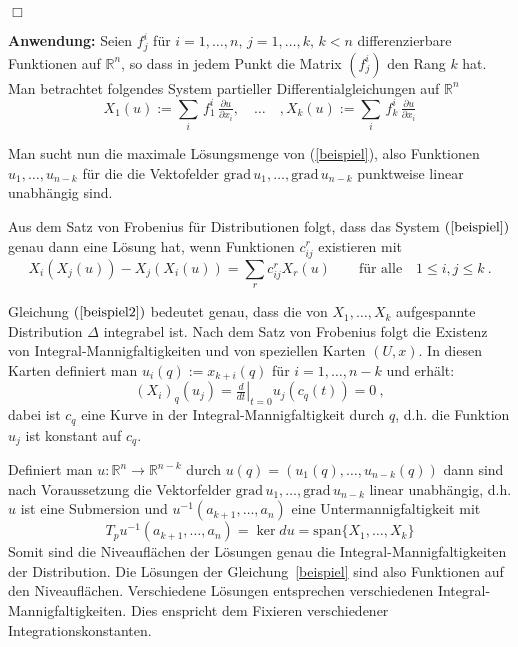 \documentclass[12pt,a4paper]{article}
\def\R{\mathbb{R}}
\def\grad{\mathrm{grad}\,}
\def\qed{\quad\hfill\ensuremath{\Box}}
\begin{document}
\qed

\bigskip

{\bf Anwendung:}
Seien $f^i_j$ f\"ur $i=1,\ldots, n, \, j=1,\ldots,k, \, k<n$ differenzierbare Funktionen auf $\R^n$, so
dass in jedem Punkt die Matrix $(f^i_j)$ den Rang $k$ hat. Man betrachtet folgendes System partieller
Differentialgleichungen auf $\R^n$
\begin{equation}\label{beispiel}
X_1(u) := \sum_i \, f^i_1 \, \tfrac{\partial u}{\partial x_i},
\quad \ldots \quad,
X_k(u)  := \sum_i \, f^i_k \, \tfrac{\partial u}{\partial x_i}
\end{equation}

Man sucht nun die maximale L\"osungsmenge von (\ref{beispiel}), also Funktionen $u_1,\ldots, u_{n-k}$
f\"ur die die Vektofelder $\grad u_1,\ldots , \grad u_{n-k}$ punktweise linear unabh\"angig sind.

\bigskip

Aus dem Satz von Frobenius f\"ur Distributionen folgt, dass das System $(\ref{beispiel})$ genau dann eine
L\"osung hat, wenn Funktionen $c^r_{ij}$ existieren mit
\begin{equation}\label{beispiel2}
X_i (X_j(u)) - X_j (X_i(u)) = \sum_r c^r_{ij} X_r(u) \qquad \mbox{f\"ur alle} \quad 1 \le i,j \le k \ .
\end{equation}

Gleichung $(\ref{beispiel2})$ bedeutet genau, dass die von $X_1,\ldots, X_k$ aufgespannte Distribution
$\Delta$ integrabel ist. Nach dem Satz von Frobenius folgt die Existenz von Integral-Mannigfaltigkeiten
und von speziellen Karten $(U,x)$. In diesen Karten definiert man $u_i(q) := x_{k+i}(q)$ f\"ur
$i = 1,\ldots, n-k$ und erh\"alt:
$$
(X_i)_q (u_j) = \left. \tfrac{d}{dt}\right|_{t=0} u_j(c_q(t)) = 0 \ ,
$$
dabei ist $c_q$ eine Kurve in der Integral-Mannigfaltigkeit durch $q$, d.h. die Funktion
$u_j$ ist konstant auf $c_q$.

\bigskip

Definiert man $u: \R^n \rightarrow \R^{n-k}$ durch $u(q)=(u_1(q), \ldots, u_{n-k}(q))$ dann sind nach
Voraussetzung die Vektorfelder $\grad u_1,\ldots, \grad u_{n-k}$ linear unabh\"angig, d.h. $u$ ist
eine Submersion und $u^{-1}(a_{k+1}, \ldots, a_n)$ eine Untermannigfaltigkeit mit
$$
T_p u^{-1}(a_{k+1}, \ldots, a_n) = \ker du = \mathrm{span} \{X_1, \ldots, X_k \}
$$
Somit sind die Niveaufl\"achen der L\"osungen genau die Integral-Mannigfaltigkeiten der
Distribution. Die L\"osungen der Gleichung~\ref{beispiel} sind also Funktionen auf den
Niveaufl\"achen. Verschiedene L\"osungen entsprechen verschiedenen Integral-Mannigfaltigkeiten.
Dies enspricht dem Fixieren verschiedener Integrationskonstanten.
\end{document}
